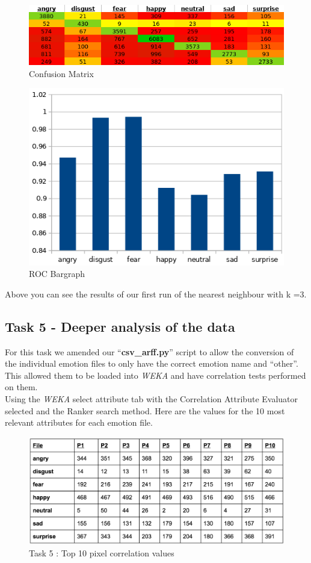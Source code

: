 \documentclass[12pt]{article}
\begin{document}
\begin{figure}[H]
	\centering
	\includegraphics[width=0.7\linewidth]{images/heatmap}
	\caption{Confusion Matrix}
	\label{fig:heatmap}
\end{figure}

\begin{figure}[H]
	\centering
	\includegraphics[width=0.5\linewidth]{images/roc_graph}
	\caption{ROC Bargraph}
	\label{fig:roc_graph}
\end{figure}


Above you can see the results of our first run of the nearest neighbour with k =3.\\

\newpage
\subsection{Task 5 - Deeper analysis of the data }

For this task we amended our ``\textbf{csv\_arff.py}'' script to allow the conversion of the individual emotion files to only have the correct emotion name and “other”. This allowed them to be loaded into \textit{WEKA} and have correlation tests performed on them.\\

Using the \textit{WEKA} select attribute tab with the Correlation Attribute Evaluator selected and the Ranker search method. Here are the values for the 10 most relevant attributes for each emotion file.\\

\begin{figure}[H]
	\centering
	\includegraphics[width=0.7\linewidth]{images/task5_results}
	\caption{Task 5 : Top 10 pixel correlation values}
	\label{fig:task5_results}
\end{figure}
\end{document}
